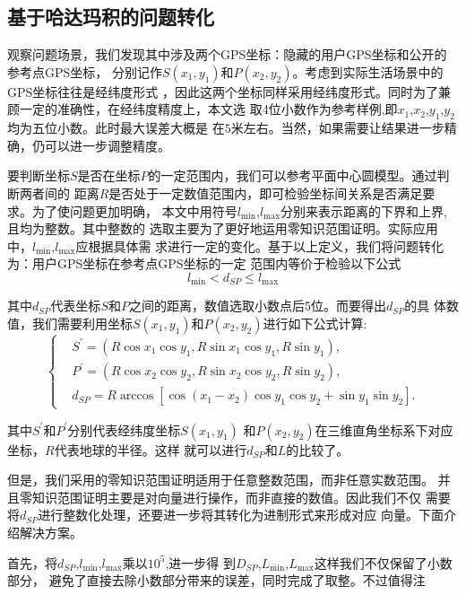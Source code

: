 \documentclass[zihao=-4]{ctexart}
\begin{document}
\subsection{基于哈达玛积的问题转化}
观察问题场景，我们发现其中涉及两个GPS坐标：隐藏的用户GPS坐标和公开的参考点GPS坐标，
分别记作$S(x_1,y_1)$和$P(x_2,y_2)$。考虑到实际生活场景中的GPS坐标往往是经纬度形式
，因此这两个坐标同样采用经纬度形式。同时为了兼顾一定的准确性，在经纬度精度上，本文选
取4位小数作为参考样例,即$x_1$,$x_2$,$y_1$,$y_2$均为五位小数。此时最大误差大概是
在$5$米左右。当然，如果需要让结果进一步精确，仍可以进一步调整精度。\par
要判断坐标$S$是否在坐标$P$的一定范围内，我们可以参考平面中心圆模型。通过判断两者间的
距离$R$是否处于一定数值范围内，即可检验坐标间关系是否满足要求。为了使问题更加明确，
本文中用符号$l_{\min}$,$l_{\max}$分别来表示距离的下界和上界,且均为整数。其中整数的
选取主要为了更好地运用零知识范围证明。实际应用中，$l_{\min}$,$l_{\max}$应根据具体需
求进行一定的变化。基于以上定义，我们将问题转化为：用户GPS坐标在参考点GPS坐标的一定
范围内等价于检验以下公式
\begin{equation}l_{\min}< d_{SP}\leq l_{\max}\end{equation}\par
其中$d_{SP}$代表坐标$S$和$P$之间的距离，数值选取小数点后5位。而要得出$d_{SP}$的具
体数值，我们需要利用坐标$S(x_1,y_1)$和$P(x_2,y_2)$进行如下公式计算:
\begin{equation}
  \begin{cases}
    &S^{\prime}=(R\cos x_1\cos y_1,R\sin x_1\cos y_1,R\sin y_1),\\
    &P^{\prime}=(R\cos x_2\cos y_2,R\sin x_2\cos y_2,R\sin y_2),\\
    &d_{SP}=R\arccos[\cos(x_1-x_2)\cos y_1\cos y_2+\sin y_1\sin y_2].
  \end{cases}
\end{equation}\par
其中$S^{\prime}$和$P^{\prime}$分别代表经纬度坐标$S(x_1,y_1)$
和$P(x_2,y_2)$在三维直角坐标系下对应坐标，$R$代表地球的半径。这样
就可以进行$d_{SP}$和$L$的比较了。\par
但是，我们采用的零知识范围证明适用于任意整数范围，而非任意实数范围。
并且零知识范围证明主要是对向量进行操作，而非直接的数值。因此我们不仅
需要将$d_{SP}$进行整数化处理，还要进一步将其转化为进制形式来形成对应
向量。下面介绍解决方案。\par
首先，将$d_{SP}$,$l_{\min}$,$l_{\max}$乘以$10^5$,进一步得
到$D_{SP}$,$L_{\min}$,$L_{\max}$这样我们不仅保留了小数部分，
避免了直接去除小数部分带来的误差，同时完成了取整。不过值得注
\end{document}
